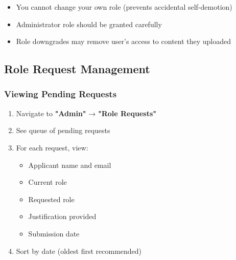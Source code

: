 \documentclass[12pt,a4paper]{article}
\begin{document}
\begin{tcolorbox}[colback=red!5!white,colframe=red,title=Role Change Restrictions]
\begin{itemize}[leftmargin=*]
    \item You cannot change your own role (prevents accidental self-demotion)
    \item Administrator role should be granted carefully
    \item Role downgrades may remove user's access to content they uploaded
\end{itemize}
\end{tcolorbox}

\subsection{Role Request Management}

\subsubsection{Viewing Pending Requests}
\begin{enumerate}[leftmargin=*]
    \item Navigate to \textbf{"Admin"} → \textbf{"Role Requests"}
    \item See queue of pending requests
    \item For each request, view:
        \begin{itemize}
            \item Applicant name and email
            \item Current role
            \item Requested role
            \item Justification provided
            \item Submission date
        \end{itemize}
    \item Sort by date (oldest first recommended)
\end{enumerate}
\end{document}
